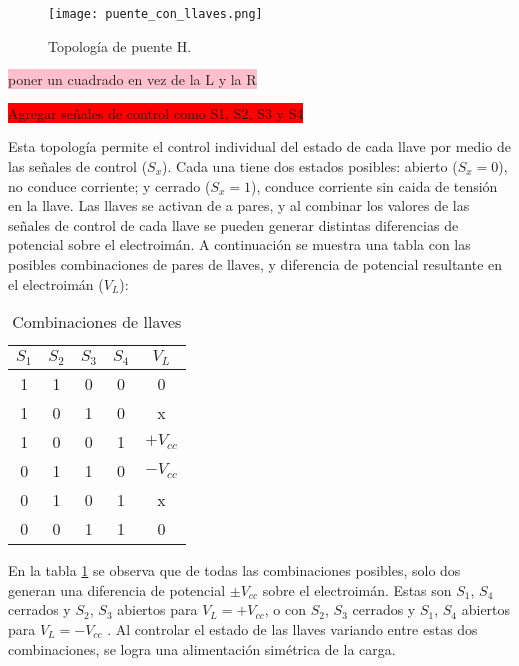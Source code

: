 \begin{figure}[H]
	\centering
	\texttt{[image: puente\_con\_llaves.png]}
	\caption{Topología de puente H.}
	\label{fig:img_topologia_simplificada}
\end{figure}

\colorbox{pink}{poner un cuadrado en vez de la L y la R}

\colorbox{red}{Agregar señales de control como S1, S2, S3 y S4}

Esta topología permite el control individual del estado de cada llave por medio de las señales de control ($S_x$). Cada una tiene dos estados posibles: abierto ($S_x=0$), no conduce corriente; y cerrado ($S_x=1$), conduce corriente sin caida de tensión en la llave. Las llaves se activan de a pares, y al combinar los valores de las señales de control de cada llave se pueden generar distintas diferencias de potencial sobre el electroimán. A continuación se muestra una tabla con las posibles combinaciones de pares de llaves, y diferencia de potencial resultante en el electroimán ($V_L$):

\begin{table}[H]
	\begin{center}
		\begin{tabular}{| c | c | c | c | c |}
			\hline
			$S_1$ & $S_2$ & $S_3$ & $S_4$ & $V_L$ \\ \hline
			1 & 1 & 0 & 0 & 0 \\ \hline 
			1 & 0 & 1 & 0 & x \\ \hline 
			1 & 0 & 0 & 1 & $+V_{cc}$ \\ \hline 
			0 & 1 & 1 & 0 & $-V_{cc}$ \\ \hline 
			0 & 1 & 0 & 1 & x \\ \hline 
			0 & 0 & 1 & 1 & 0 \\ \hline 
		\end{tabular}
		\caption{Combinaciones de llaves}
		\label{tab_llaves}
	\end{center}
\end{table}

En la tabla \ref{tab_llaves} se observa que de todas las combinaciones posibles, solo dos generan una diferencia de potencial $\pm V_{cc}$ sobre el electroimán. Estas son  $S_1$, $S_4$ cerrados y $S_2$, $S_3$ abiertos para $V_L=+V_{cc}$, o con $S_2$, $S_3$ cerrados y $S_1$, $S_4$ abiertos para $V_L=-V_{cc}$ . Al controlar el estado de las llaves variando entre estas dos combinaciones, se logra una alimentación simétrica de la carga.

